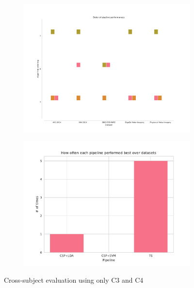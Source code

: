 \begin{figure}
    \begin{subfigure}[h]{0.45\textwidth}
        \includegraphics[width=\textwidth]{./WithinSessionEvaluation_/ordering.pdf}
    \end{subfigure}
    \begin{subfigure}[h]{0.45\textwidth}
        \includegraphics[width=\textwidth]{./WithinSessionEvaluation_/summary.pdf}
    \end{subfigure}
    \caption{Cross-subject evaluation using only C3 and C4}
\end{figure}
